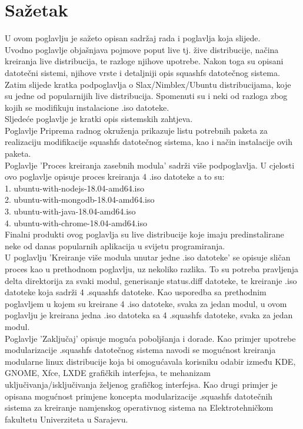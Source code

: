 \documentclass[12pt,vi]{mitthesis}
\begin{document}
\chapter*{Sažetak}
\indent
U ovom poglavlju je sažeto opisan sadržaj rada i poglavlja koja slijede.\\
\indent
Uvodno poglavlje objašnjava pojmove poput live tj. žive distribucije, načina kreiranja live distribucija, te razloge njihove upotrebe.
Nakon toga su opisani datotečni sistemi, njihove vrste i detaljniji opis squashfs datotečnog sistema.
Zatim slijede kratka podpoglavlja o Slax/Nimblex/Ubuntu distribucijama, koje su jedne od popularnijih live distribucija. Spomenuti su i neki od razloga zbog kojih se modifikuju instalacione .iso datoteke.\\
\indent
Sljedeće poglavlje je kratki opis sistemskih zahtjeva.\\
\indent
Poglavlje Priprema radnog okruženja prikazuje listu potrebnih paketa za realizaciju modifikacije squashfs datotečnog sistema, kao i način instalacije ovih paketa.\\
\indent
Poglavlje 'Proces kreiranja zasebnih modula' sadrži više podpoglavlja. U cjelosti ovo poglavlje opisuje proces kreiranja 4 .iso datoteke a to su:\\
1. ubuntu-with-nodejs-18.04-amd64.iso\\
2. ubuntu-with-mongodb-18.04-amd64.iso\\
3. ubuntu-with-java-18.04-amd64.iso\\
4. ubuntu-with-chrome-18.04-amd64.iso\\
Finalni produkti ovog poglavlja su live distribucije koje imaju predinstalirane neke od danas popularnih aplikacija u svijetu programiranja.\\
\indent
U poglavlju 'Kreiranje više modula unutar jedne .iso datoteke' se opisuje sličan proces kao u prethodnom poglavlju, uz nekoliko razlika. To su potreba pravljenja delta direktorija za svaki modul, generisanje status.diff datoteke, te kreiranje .iso datoteke koja sadrži 4 .squashfs datoteke. Kao usporedba sa prethodnim poglavljem u kojem su kreirane 4 .iso datoteke, svaka za jedan modul, u ovom poglavlju je kreirana jedna .iso datoteka sa 4 .squashfs datoteke, svaka za jedan modul.\\
\indent
Poglavlje 'Zaključaj' opisuje moguća poboljšanja i dorade. Kao primjer upotrebe modularizacije .squashfs datotečnog sistema navodi se mogućnost kreiranja modularne linux distribucije koja bi omogućavala korisniku odabir između KDE, GNOME, Xfce, LXDE grafičkih interfejsa, te mehanizam uključivanja/isključivanja željenog grafičkog interfejsa. Kao drugi primjer je opisana mogućnost primjene koncepta modularizacije .squashfs datotečnih sistema za kreiranje namjenskog operativnog sistema na Elektrotehničkom fakultetu Univerziteta u Sarajevu.
\end{document}

